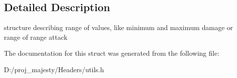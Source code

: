 \subsection{Detailed Description}
structure describing range of values, like minimum and maximum damage or range of range attack 

The documentation for this struct was generated from the following file\+:\begin{DoxyCompactItemize}
\item 
D\+:/proj\+\_\+majesty/\+Headers/utils.\+h\end{DoxyCompactItemize}
